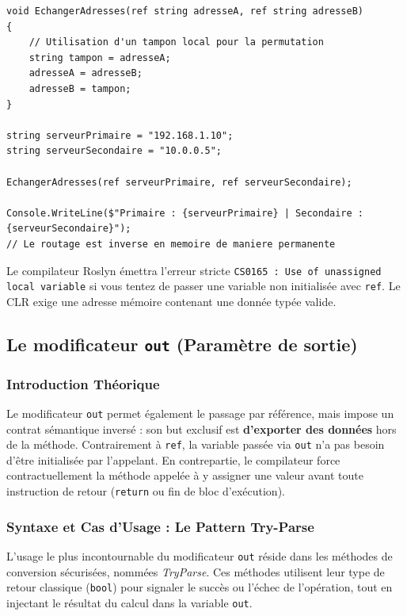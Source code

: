 \begin{lstlisting}[caption={Algorithme d'échange via passage par référence}]
void EchangerAdresses(ref string adresseA, ref string adresseB)
{
    // Utilisation d'un tampon local pour la permutation
    string tampon = adresseA;
    adresseA = adresseB;
    adresseB = tampon;
}

string serveurPrimaire = "192.168.1.10";
string serveurSecondaire = "10.0.0.5";

EchangerAdresses(ref serveurPrimaire, ref serveurSecondaire);

Console.WriteLine($"Primaire : {serveurPrimaire} | Secondaire : {serveurSecondaire}");
// Le routage est inverse en memoire de maniere permanente
\end{lstlisting}

\begin{tcolorbox}[colback=backcolour,colframe=keywordcolor,title=\textbf{Pièges courants : Oubli d'initialisation}]
    Le compilateur Roslyn émettra l'erreur stricte \texttt{CS0165 : Use of unassigned local variable} si vous tentez de passer une variable non initialisée avec \texttt{ref}. Le CLR exige une adresse mémoire contenant une donnée typée valide.
\end{tcolorbox}

\subsection{Le modificateur \texttt{out} (Paramètre de sortie)}

\subsubsection{Introduction Théorique}
Le modificateur \texttt{out} permet également le passage par référence, mais impose un contrat sémantique inversé : son but exclusif est \textbf{d'exporter des données} hors de la méthode. Contrairement à \texttt{ref}, la variable passée via \texttt{out} n'a pas besoin d'être initialisée par l'appelant. En contrepartie, le compilateur force contractuellement la méthode appelée à y assigner une valeur avant toute instruction de retour (\texttt{return} ou fin de bloc d'exécution).

\subsubsection{Syntaxe et Cas d'Usage : Le Pattern Try-Parse}
L'usage le plus incontournable du modificateur \texttt{out} réside dans les méthodes de conversion sécurisées, nommées \emph{TryParse}. Ces méthodes utilisent leur type de retour classique (\texttt{bool}) pour signaler le succès ou l'échec de l'opération, tout en injectant le résultat du calcul dans la variable \texttt{out}.

